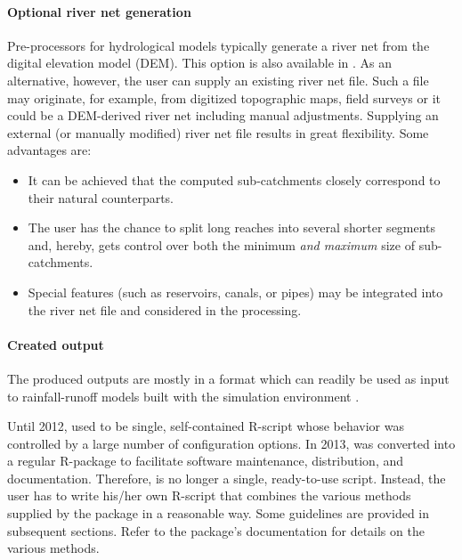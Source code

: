 \paragraph{Optional river net generation} Pre-processors for hydrological models typically generate a river net from the digital elevation model (DEM). This option is also available in . As an alternative, however, the user can supply an existing river net file. Such a file may originate, for example, from digitized topographic maps, field surveys or it could be a DEM-derived river net including manual adjustments. Supplying an external (or manually modified) river net file results in great flexibility. Some advantages are:
\begin{itemize}
  \item It can be achieved that the computed sub-catchments closely correspond to their natural counterparts.
  \item The user has the chance to split long reaches into several shorter segments and, hereby, gets control over both the minimum \emph{and maximum} size of sub-catchments.
  \item Special features (such as reservoirs, canals, or pipes) may be integrated into the river net file and considered in the processing.
\end{itemize}

\paragraph{Created output} The produced outputs are mostly in a format which can readily be used as input to rainfall-runoff models built with the  simulation environment \citep[see][]{Echse-Main-Doc}.

Until 2012,  used to be single, self-contained R-script whose behavior was controlled by a large number of configuration options. In 2013,  was converted into a regular R-package to facilitate software maintenance, distribution, and documentation. Therefore,  is no longer a single, ready-to-use script. Instead, the user has to write his/her own R-script that combines the various methods supplied by the package in a reasonable way. Some guidelines are provided in subsequent sections. Refer to the package's documentation for details on the various methods.


